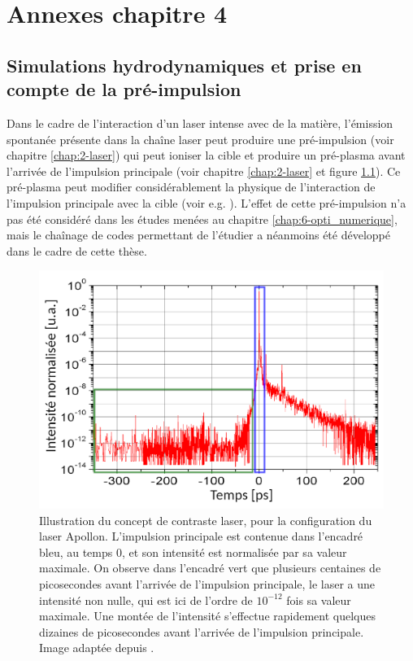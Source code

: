 \chapter{Annexes chapitre 4}
\section{Simulations hydrodynamiques et prise en compte de la pré-impulsion}
\label{an:4-FLASH_to_Smilei}

Dans le cadre de l'interaction d'un laser intense avec de la matière, l'émission spontanée présente dans la chaîne laser peut produire une pré-impulsion (voir chapitre \ref{chap:2-laser}) qui peut ioniser la cible et produire un pré-plasma avant l'arrivée de l'impulsion principale (voir chapitre \ref{chap:2-laser} et figure \ref{fig:A4-contraste_laser}). Ce pré-plasma peut modifier considérablement la physique de l'interaction de l'impulsion principale avec la cible (voir e.g. \parencite{chopineau_2019}). L'effet de cette pré-impulsion n'a pas été considéré dans les études menées au chapitre \ref{chap:6-opti_numerique}, mais le chaînage de codes permettant de l'étudier a néanmoins été développé dans le cadre de cette thèse.

\begin{figure}[htbp]
    \centering
    \includegraphics[width=0.6\linewidth]{2-laser/contraste_laser_Papadopoulos.png}
    \caption{Illustration du concept de contraste laser, pour la configuration du laser Apollon. L'impulsion principale est contenue dans l'encadré bleu, au temps 0, et son intensité est normalisée par sa valeur maximale. On observe dans l'encadré vert que plusieurs centaines de picosecondes avant l'arrivée de l'impulsion principale, le laser a une intensité non nulle, qui est ici de l'ordre de $10^{-12}$ fois sa valeur maximale. Une montée de l'intensité s'effectue rapidement quelques dizaines de picosecondes avant l'arrivée de l'impulsion principale. Image adaptée depuis \parencite{papadopoulos_2017}.}
    \label{fig:A4-contraste_laser}
\end{figure}


